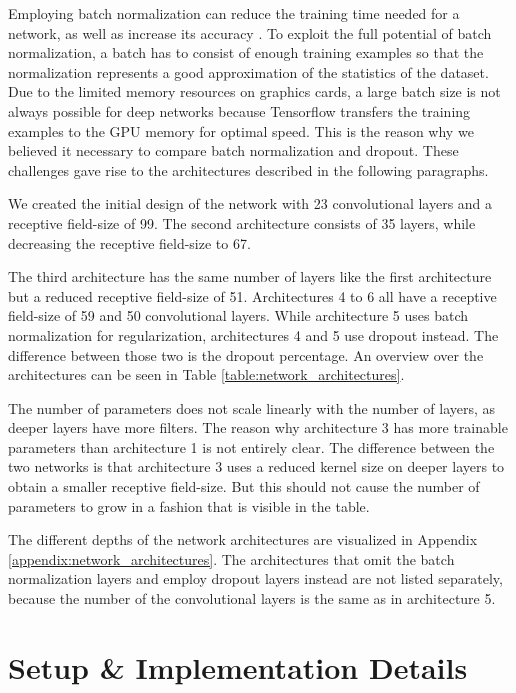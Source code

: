 Employing batch normalization can reduce the training time needed for a network, as well as increase its accuracy \cite{batch_normalization}. To exploit the full potential of batch normalization, a batch has to consist of enough training examples so that the normalization represents a good approximation of the statistics of the dataset. Due to the limited memory resources on graphics cards, a large batch size is not always possible for deep networks because Tensorflow transfers the training examples to the GPU memory for optimal speed. This is the reason why we believed it necessary to compare batch normalization and dropout. These challenges gave rise to the architectures described in the following paragraphs.

We created the initial design of the network with 23 convolutional layers and a receptive field-size of 99. The second architecture consists of 35 layers, while decreasing the receptive field-size to 67. 

The third architecture has the same number of layers like the first architecture but a reduced receptive field-size of 51. Architectures 4 to 6 all have a receptive field-size of 59 and 50 convolutional layers. While architecture 5 uses batch normalization for regularization, architectures 4 and 5 use dropout instead. The difference between those two is the dropout percentage. An overview over the architectures can be seen in Table \ref{table:network_architectures}. 

The number of parameters does not scale linearly with the number of layers, as deeper layers have more filters. The reason why architecture 3 has more trainable parameters than architecture 1 is not entirely clear. The difference between the two networks is that architecture 3 uses a reduced kernel size on deeper layers to obtain a smaller receptive field-size. But this should not cause the number of parameters to grow in a fashion that is visible in the table.

The different depths of the network architectures are visualized in Appendix \ref{appendix:network_architectures}. The architectures that omit the batch normalization layers and employ dropout layers instead are not listed separately, because the number of the convolutional layers is the same as in architecture 5.

\section{Setup \& Implementation Details}

